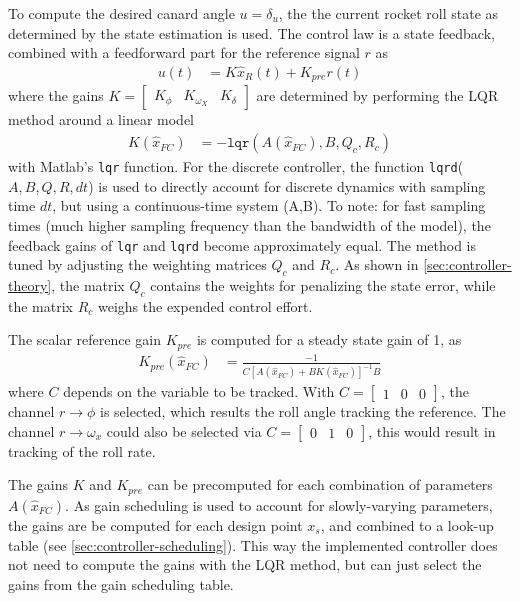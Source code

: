 To compute the desired canard angle $u = \delta_u$, the the current rocket roll state as determined by the state estimation is used.
The control law is a state feedback, combined with a feedforward part for the reference signal $r$ as
\begin{align}
    u(t) &= K \hat x_R(t) + K_{pre} r(t)
\end{align}
where the gains $K = \begin{bmatrix} K_\phi & K_{\omega_X} & K_\delta \end{bmatrix}$ are determined by performing the LQR method around a linear model
\begin{align}
    K(\hat x_{FC}) &= -\texttt{lqr}(A(\hat x_{FC}),B,Q_{c},R_{c}) 
\end{align}
with Matlab's \texttt{lqr} function. 
For the discrete controller, the function \texttt{lqrd}($A, B, Q, R, dt$) is used to directly account for discrete dynamics with sampling time $dt$, but using a continuous-time system (A,B). 
To note: for fast sampling times (much higher sampling frequency than the bandwidth of the model), the feedback gains of \texttt{lqr} and \texttt{lqrd} become approximately equal.
The method is tuned by adjusting the weighting matrices $Q_c$ and $R_c$.
As shown in \autoref{sec:controller-theory}, the matrix $Q_c$ contains the weights for penalizing the state error, while the matrix $R_c$ weighs the expended control effort.

The scalar reference gain $K_{pre}$ is computed for a steady state gain of 1, as
\begin{align}
    K_{pre} (\hat x_{FC}) &=  \frac{-1}{C \left[ A(\hat x_{FC}) + B K(\hat x_{FC}) \right]^{-1} B}
\end{align}
where $C$ depends on the variable to be tracked. 
With $C = \begin{bmatrix} 1 & 0 & 0 \end{bmatrix}$, the channel $r \to \phi$ is selected, which results the roll angle tracking the reference.
The channel $r \to \omega_x$ could also be selected via $C = \begin{bmatrix} 0 & 1 & 0 \end{bmatrix}$, this would result in tracking of the roll rate.

The gains $K$ and $K_{pre}$ can be precomputed for each combination of parameters $A(\hat x_{FC})$.
As gain scheduling is used to account for slowly-varying parameters, the gains are be computed for each design point $x_s$, and combined to a look-up table (see \autoref{sec:controller-scheduling}).
This way the implemented controller does not need to compute the gains with the LQR method, but can just select the gains from the gain scheduling table. 

